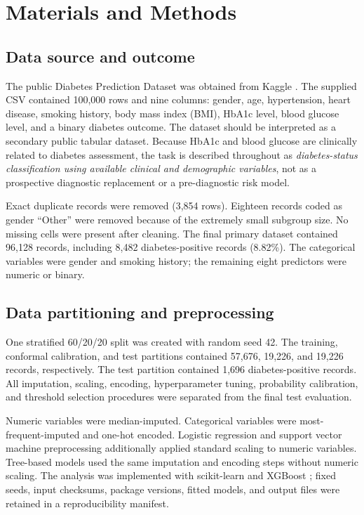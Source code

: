 \documentclass{ieeeaccess}
\newcommand{\dataset}{Diabetes Prediction Dataset}
\begin{document}
\section{Materials and Methods}
\subsection{Data source and outcome}
The public \dataset{} was obtained from Kaggle \cite{mustafa2023dataset}. The supplied CSV contained 100,000 rows and nine columns: gender, age, hypertension, heart disease, smoking history, body mass index (BMI), HbA1c level, blood glucose level, and a binary diabetes outcome. The dataset should be interpreted as a secondary public tabular dataset. Because HbA1c and blood glucose are clinically related to diabetes assessment, the task is described throughout as \emph{diabetes-status classification using available clinical and demographic variables}, not as a prospective diagnostic replacement or a pre-diagnostic risk model.

Exact duplicate records were removed (3,854 rows). Eighteen records coded as gender ``Other'' were removed because of the extremely small subgroup size. No missing cells were present after cleaning. The final primary dataset contained 96,128 records, including 8,482 diabetes-positive records (8.82\%). The categorical variables were gender and smoking history; the remaining eight predictors were numeric or binary.

\subsection{Data partitioning and preprocessing}
One stratified 60/20/20 split was created with random seed 42. The training, conformal calibration, and test partitions contained 57,676, 19,226, and 19,226 records, respectively. The test partition contained 1,696 diabetes-positive records. All imputation, scaling, encoding, hyperparameter tuning, probability calibration, and threshold selection procedures were separated from the final test evaluation.

Numeric variables were median-imputed. Categorical variables were most-frequent-imputed and one-hot encoded. Logistic regression and support vector machine preprocessing additionally applied standard scaling to numeric variables. Tree-based models used the same imputation and encoding steps without numeric scaling. The analysis was implemented with scikit-learn \cite{pedregosa2011sklearn} and XGBoost \cite{chen2016xgboost}; fixed seeds, input checksums, package versions, fitted models, and output files were retained in a reproducibility manifest.
\end{document}
